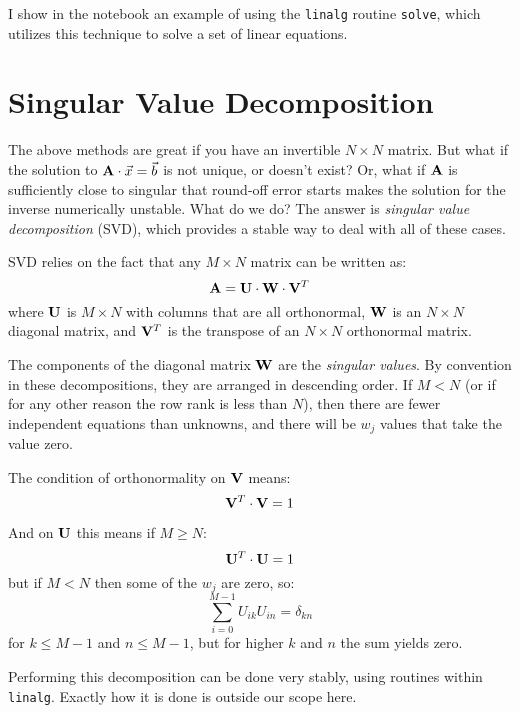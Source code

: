 I show in the notebook an example of using the {\tt linalg} routine
{\tt solve}, which utilizes this technique to solve a set of linear
equations. 

\section{Singular Value Decomposition}

The above methods are great if you have an invertible $N\times N$
matrix. But what if the solution to ${\bf A}\cdot \vec{x} = \vec{b}$
is not unique, or doesn't exist? Or, what if ${\bf A}$ is sufficiently
close to singular that round-off error starts makes the solution for
the inverse numerically unstable. What do we do? The answer is {\it
  singular value decomposition} (SVD), which provides a stable way to
deal with all of these cases.

SVD  relies on the fact that any $M\times N$ matrix can be written
as:
\begin{equation}
{\bf A} = {\bf U}\cdot{\bf W}\cdot{\bf V}^T
\end{equation}
where ${\bf U}$ is $M\times N$ with columns that are all orthonormal,
${\bf W}$ is an $N\times N$ diagonal matrix, and ${\bf V}^T$ is the
transpose of an $N \times N$ orthonormal matrix.

The components of the diagonal matrix ${\bf W}$ are the {\it singular
  values}.  By convention in these decompositions, they are arranged
in descending order. If $M<N$ (or if for any other reason the row rank
is less than $N$), then there are fewer independent equations than
unknowns, and there will be $w_j$ values that take the value zero.

The condition of orthonormality on ${\bf V}$ means:
\begin{equation}
{\bf V}^T \cdot {\bf V} = 1
\end{equation}

And on ${\bf U}$ this means if $M\ge N$:
\begin{equation}
{\bf U}^T \cdot {\bf U} = 1
\end{equation}
but if $M<N$ then some of the $w_j$ are zero, so:
\begin{equation}
\sum_{i=0}^{M-1} U_{ik} U_{in} = \delta_{kn}
\end{equation}
for $k\le M-1$ and $n\le M-1$, but for higher $k$ and $n$ the sum
yields zero.

Performing this decomposition can be done very stably, using routines
within {\tt linalg}. Exactly how it is done is outside our scope here. 

